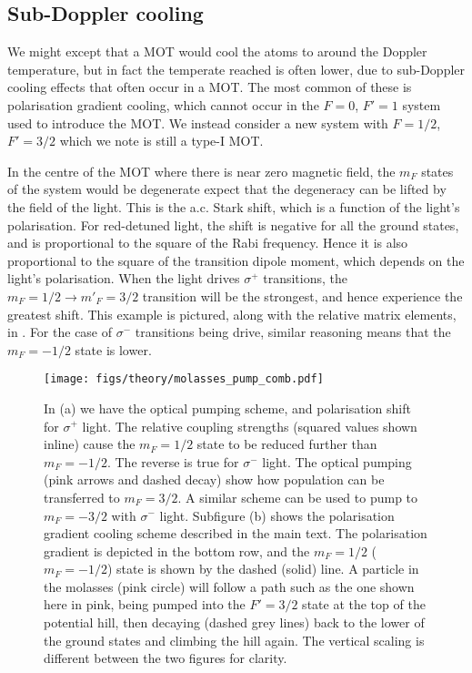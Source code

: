 \subsection{Sub-Doppler cooling}

We might except that a MOT would cool the atoms to around the Doppler
temperature, but in fact the temperate reached is often lower, due to
sub-Doppler cooling effects that often occur in a MOT. The most common of these
is polarisation gradient cooling, which cannot occur in the $F=0$, $F'=1$
system used to introduce the MOT. We instead consider a new system with
$F=1/2$, $F'=3/2$ which we note is still a type-I MOT.

In the centre of the MOT where there is near zero magnetic field, the $m_F$
states of the system would be degenerate expect that the degeneracy can be
lifted by the field of the light. This is the a.c. Stark shift, which is a
function of the light's polarisation.
%
For red-detuned light, the shift is negative for all the ground states, and is
proportional to the square of the Rabi frequency. Hence it is also proportional
to the square of the transition dipole moment, which depends on the light's
polarisation.
%
When the light drives $\sigma^+$ transitions, the $m_F=1/2 \rightarrow
m'_F=3/2$ transition will be the strongest, and hence experience the greatest
shift. This example is pictured, along with the relative matrix elements, in 
. For the case of $\sigma^-$ transitions
being drive, similar reasoning means that the $m_F=-1/2$ state is lower.

\begin{figure}[htb]
  \centering
  \texttt{[image: figs/theory/molasses\_pump\_comb.pdf]}
    \caption[Subdoppler cooling]{
      In (a) we have the optical pumping scheme, and polarisation shift
      for $\sigma^+$ light. The relative coupling strengths (squared values
      shown inline) cause the $m_F=1/2$ state to be reduced further than
      $m_F=-1/2$.  The reverse is true for $\sigma^-$ light. The optical
      pumping (pink arrows and dashed decay) show how population can be
      transferred to $m_F=3/2$. A similar scheme can be used to pump to
      $m_F=-3/2$ with $\sigma^-$ light. Subfigure (b) shows the polarisation
      gradient cooling scheme described in the main text.  The polarisation
      gradient is depicted in the bottom row, and the $m_F=1/2$ ($m_F=-1/2$)
      state is shown by the dashed (solid) line. A particle in the molasses
      (pink circle) will follow a path such as the one shown here in pink,
      being pumped into the $F'=3/2$ state at the top of the potential hill,
      then decaying (dashed grey lines) back to the lower of the ground states
      and climbing the hill again. The vertical scaling is different between
      the two figures for clarity.
  }
  \label{theory:fig:subdoppler}
\end{figure}

